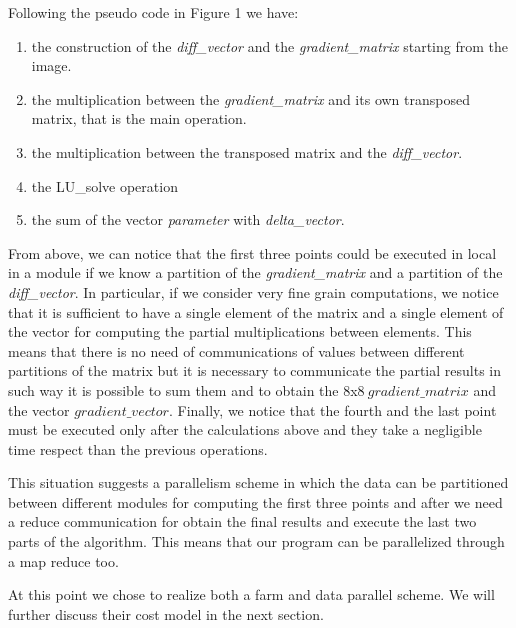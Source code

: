 Following the pseudo code in Figure 1 we have:
\begin{enumerate}
\item the construction of the \textit{diff\_vector} and the \textit{gradient\_matrix} starting from the image.
\item the multiplication between the \textit{gradient\_matrix} and its own transposed matrix, that is the main operation.
\item the multiplication between the transposed matrix and the \textit{diff\_vector}.
\item the LU\_solve operation
\item the sum of the vector \textit{parameter} with \textit{delta\_vector}.
\end{enumerate}

From above, we can notice that the first three points could be executed in local in a module if we know a partition of the \textit{gradient\_matrix} and a partition of the \textit{diff\_vector}. In particular, if we consider very fine grain computations, we notice that it is sufficient to have a single element of the matrix and a single element of the vector for computing the partial multiplications between elements. This means that there is no need of communications of values between different partitions of the matrix but it is necessary to communicate the partial results in such way it is possible to sum them and to obtain the $8$x$8\ gradient\_matrix$ and the vector $gradient\_vector$. Finally, we notice that the fourth and the last point must be executed only after the calculations above and they take a negligible time respect than the previous operations.

This situation suggests a parallelism scheme in which the data can be partitioned between different modules for computing the first three points and after we need a reduce communication for obtain the final results and execute the last two parts of the algorithm. This means that our program can be parallelized through a map reduce too.

At this point we chose to realize both a farm and data parallel scheme. We will further discuss their cost model in the next section.